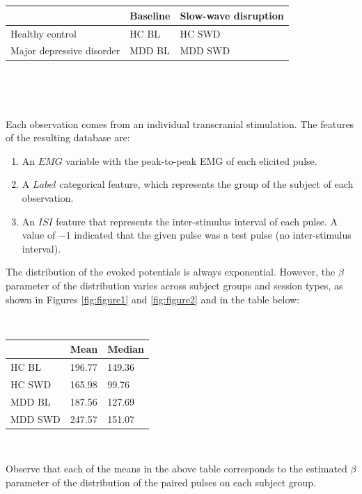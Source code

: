 \documentclass{article}
\begin{document}
\begin{multicols}{2}
~

~

\begin{tabular}{ |p{2cm}|p{2cm}|p{2cm}|  }
\hline
& Baseline & Slow-wave disruption \\
\hline
Healthy control & HC BL & HC SWD \\
\hline
Major depressive disorder & MDD BL & MDD SWD \\
\hline
\end{tabular}

~

~

Each observation comes from an individual transcranial stimulation. The features
of the resulting database are:

\begin{enumerate}
    \item An $EMG$ variable with the peak-to-peak EMG of each elicited pulse.
    \item A $Label$ categorical feature, which represents the group of
        the subject of each observation. 
    \item An $ISI$ feature that represents the inter-stimulus interval of each
        pulse. A value of $-1$ indicated that the given pulse was a test pulse (no
        inter-stimulus interval).
\end{enumerate}

The distribution of the evoked potentials is always exponential. However, the
$\beta$ parameter of the distribution varies across subject groups and session
types, as shown in Figures \ref{fig:figure1} and \ref{fig:figure2} and in the
table below:

~

    \begin{tabular}{ |p{2cm}|p{2cm}|p{2cm}|  }
    \hline
    &       Mean & Median \\
    \hline
    HC BL & 196.77 & 149.36 \\
    \hline
    HC SWD & 165.98 & 99.76 \\
    \hline 
    MDD BL & 187.56 & 127.69\\ 
    \hline 
    MDD SWD & 247.57 & 151.07 \\
    \hline
    \end{tabular}

~ 

Observe that each of the means in the above table corresponds to the estimated
$\beta$ parameter of the distribution of the paired pulses on each subject
group.


\end{multicols}
\end{document}
